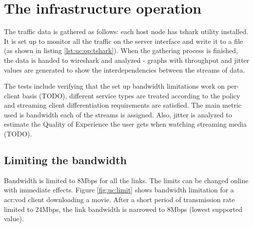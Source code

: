 \documentclass[11pt]{book}
\begin{document}
        \noindent
        \begin{minipage}{\textwidth}
          
        \end{minipage}


    \section{The infrastructure operation}
    \label{sec:uc:operation}

      The traffic data is gathered as follows: each host node has tshark utility installed. It is set up to monitor all
      the traffic on the server interface and write it to a file (as shown in listing \ref{lst:uc:op:tshark}). When the
      gathering process is finished, the data is handed to wireshark and analyzed - graphs with throughput and jitter
      values are generated to show the interdependencies between the streams of data. \\

      \noindent
      \begin{minipage}{\textwidth}
        
      \end{minipage}

      The tests include verifying that the set up bandwidth limitations work on per-client basis (TODO), different
      service types are treated according to the policy and streaming client differentiation requirements are satisfied.
      The main metric used is bandwidth each of the streams is assigned. Also, jitter is analyzed to estimate the
      Quality of Experience the user gets when watching streaming media (TODO).


      \subsection{Limiting the bandwidth}
      \label{sub:uc:limit}

        Bandwidth is limited to 8Mbps for all the links. The limits can be changed online with immediate effects. Figure
        \ref{fig:uc:limit} shows bandwidth limitation for a \gls{acr:vod} client downloading a movie. After a short period of
        transmission rate limited to 24Mbps, the link bandwidth is narrowed to 8Mbps (lowest supported value).
\end{document}
